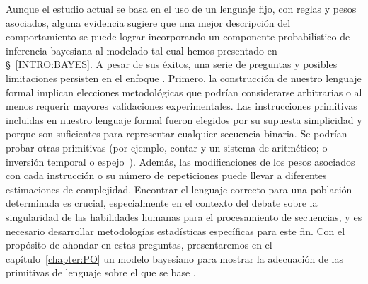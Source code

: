 
Aunque el estudio actual se basa en el uso de un lenguaje fijo, con reglas y pesos asociados, alguna evidencia sugiere que una mejor descripción del comportamiento se puede lograr incorporando un componente probabilístico de inferencia bayesiana al modelado tal cual hemos presentado en \S~\ref{INTRO:BAYES}. A pesar de sus éxitos, una serie de preguntas y posibles limitaciones persisten en el enfoque \lot. Primero, la construcción de nuestro lenguaje formal implican elecciones metodológicas que podrían considerarse arbitrarias o al menos requerir mayores validaciones experimentales. Las instrucciones primitivas incluidas en nuestro lenguaje formal fueron elegidos por su supuesta simplicidad y porque son suficientes para representar cualquier secuencia binaria. Se podrían probar otras primitivas (por ejemplo, contar y un sistema de aritmético; o inversión temporal o espejo~\cite{f10}). Además, las modificaciones de los pesos asociados con cada instrucción o su número de repeticiones puede llevar a diferentes estimaciones de complejidad. Encontrar el lenguaje correcto para una población determinada es crucial, especialmente en el contexto del debate sobre la singularidad de las habilidades humanas para el procesamiento de secuencias, y es necesario desarrollar metodologías estadísticas específicas para este fin. Con el propósito de ahondar en estas preguntas, presentaremos en el capítulo~\ref{chapter:PO} un modelo bayesiano para mostrar la adecuación de las primitivas de lenguaje \gramgeo sobre el que se base \grambin. 


